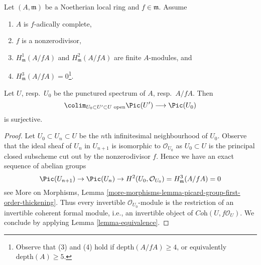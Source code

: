 \begin{lemma}
\label{lemma-surjective-Pic-first}
Let $(A, \mathfrak m)$ be a Noetherian local ring and $f \in \mathfrak m$.
Assume
\begin{enumerate}
\item $A$ is $f$-adically complete,
\item $f$ is a nonzerodivisor,
\item $H^1_\mathfrak m(A/fA)$ and $H^2_\mathfrak m(A/fA)$
are finite $A$-modules, and
\item $H^3_\mathfrak m(A/fA) = 0$\footnote{Observe that (3) and (4) hold
if $\text{depth}(A/fA) \geq 4$, or equivalently $\text{depth}(A) \geq 5$.}.
\end{enumerate}
Let $U$, resp.\ $U_0$ be the punctured spectrum of $A$, resp.\ $A/fA$.
Then
$$
\colim_{U_0 \subset U' \subset U\text{ open}} \Pic(U')
\longrightarrow
\Pic(U_0)
$$
is surjective.
\end{lemma}

\begin{proof}
Let $U_0 \subset U_n \subset U$ be the $n$th infinitesimal neighbourhood
of $U_0$. Observe that the ideal sheaf of $U_n$ in $U_{n + 1}$ is
isomorphic to $\mathcal{O}_{U_0}$ as $U_0 \subset U$ is the principal
closed subscheme cut out by the nonzerodivisor $f$. Hence we have
an exact sequence of abelian groups
$$
\Pic(U_{n + 1}) \to \Pic(U_n) \to
H^2(U_0, \mathcal{O}_{U_0}) = H^3_\mathfrak m(A/fA) = 0
$$
see More on Morphisms, Lemma
\ref{more-morphisms-lemma-picard-group-first-order-thickening}.
Thus every invertible $\mathcal{O}_{U_0}$-module is the restriction
of an invertible coherent formal module, i.e., an invertible object of
$\textit{Coh}(U, f\mathcal{O}_U)$. We conclude by applying
Lemma \ref{lemma-equivalence}.
\end{proof}

